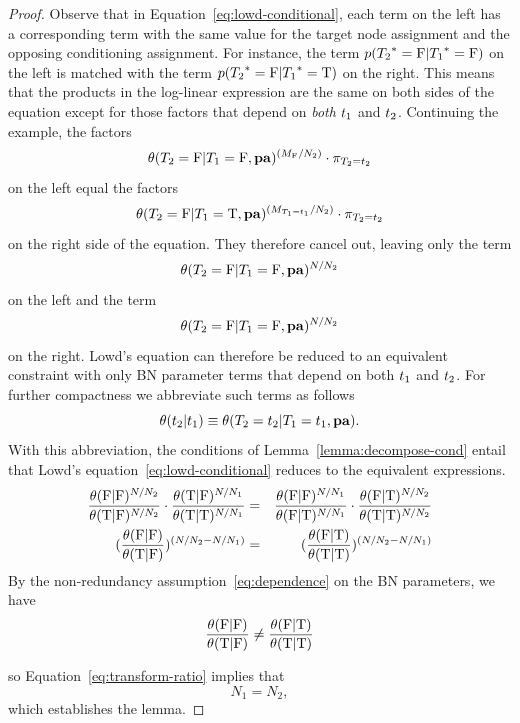 \documentclass[runningheads,a4paper]{llncs}
\begin{document}
\begin{proof}
Observe that in Equation~\eqref{eq:lowd-conditional}, each term on the left has a corresponding term with the same value for the target node assignment and the opposing conditioning assignment. For instance, the term $p({T_{2}}^{*}\hspace{0.0ex}=\mathrm{F}|{T_{1}}^{*}\hspace{0.0ex}=\mathrm{F})$ on the left is matched with the term $p({T_{2}}^{*}\hspace{0.0ex}=\mathrm{F}|{T_{1}}^{*}\hspace{0.0ex}=\mathrm{T})$ on the right. This means that the products in the log-linear expression are the same on both sides of the equation except for those factors that depend on {\em both} $t_{1}$ and $t_{2}$. Continuing the example, the factors $$\theta(T_{2} = \mathrm{F}|T_{1} = \mathrm{F},\mathbf{pa})^{(M_{\mathrm{F}}/N_{2})} \cdot \pi_{T_2=t_{2}}$$ on the left equal the factors $$\theta(T_{2} = \mathrm{F}|T_{1} = \mathrm{T},\mathbf{pa})^{(M_{T_1=t_{1}}/N_{2})}\cdot \pi_{T_2=t_{2}}$$ on the right side of the equation. They therefore cancel out, leaving only the term $$\theta(T_{2} = \mathrm{F}|T_{1} = \mathrm{F},\mathbf{pa})^{N/N_{2}}$$ on the left and the term $$\theta(T_{2} = \mathrm{F}|T_{1} = \mathrm{F},\mathbf{pa})^{N/N_{2}}$$ on the right. Lowd's equation can therefore be reduced to an equivalent constraint with only BN parameter terms that depend on both $t_{1}$ and $t_{2}$. For further compactness we abbreviate such terms as follows
%
$$\theta(t_{2}|t_{1}) \equiv \theta(T_{2} = t_{2}|T_{1} = t_{1},\mathbf{pa}).$$ With this abbreviation, the conditions of Lemma~\ref{lemma:decompose-cond} entail that Lowd's equation~\ref{eq:lowd-conditional} reduces to the equivalent expressions.
%
\begin{eqnarray}
\frac{\theta(\mathrm{F}|\mathrm{F})^{N/N_{2}}}{\theta(\mathrm{T}|\mathrm{F})^{N/N_{2}} }  \cdot \frac{\theta(\mathrm{T}|\mathrm{F})^{N/N_{1}} }{\theta(\mathrm{T}|\mathrm{T})^{N/N_{1}} }  & = & \frac{\theta(\mathrm{F}|\mathrm{F})^{N/N_{1}} }{\theta(\mathrm{F}|\mathrm{T})^{N/N_{1}} }  \cdot \frac{\theta(\mathrm{F}|\mathrm{T})^{N/N_{2}} }{\theta(\mathrm{T}|\mathrm{T})^{N/N_{2}} } \\
(\frac{\theta(\mathrm{F}|\mathrm{F})}{\theta(\mathrm{T}|\mathrm{F}) })^{\left(N/N_{2}-N/N_{1}\right)}   & = &  (\frac{\theta(\mathrm{F}|\mathrm{T}) }{\theta(\mathrm{T}|\mathrm{T})})^{\left(N/N_{2}-N/N_{1}\right)} \label{eq:transform-ratio}
\end{eqnarray}
By the non-redundancy  assumption~\eqref{eq:dependence} on the BN parameters, we have
%
$$\frac{\theta(\mathrm{F}|\mathrm{F})}{\theta(\mathrm{T}|\mathrm{F}) }   \neq  \frac{\theta(\mathrm{F}|\mathrm{T}) }{\theta(\mathrm{T}|\mathrm{T})}$$

so Equation~\ref{eq:transform-ratio} implies that 
%
$$N_{1} = N_{2}, $$ which establishes the lemma. 
\end{proof}
\end{document}
